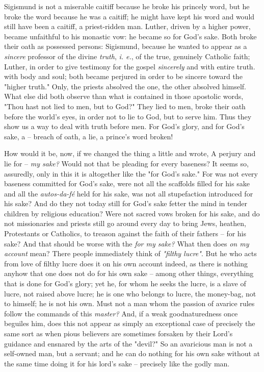 Sigismund is not a miserable caitiff because he broke his princely word, but 
he broke the word because he was a caitiff; he might have kept his word and 
would still have been a caitiff, a priest-ridden man. Luther, driven by a 
higher power, became unfaithful to his monastic vow: he became so for God's 
sake. Both broke their oath as possessed persons: Sigismund, because he wanted 
to appear as a \textit{sincere} professor of the divine \textit{truth}, 
\textit{i. e.}, of the true, genuinely Catholic faith; Luther, in order to 
give testimony for the gospel \textit{sincerely} and with entire truth. with 
body and soul; both became perjured in order to be sincere toward the 
"{}higher truth."{} Only, the priests absolved the one, the other absolved 
himself. What else did both observe than what is contained in those apostolic 
words, "{}Thou hast not lied to men, but to God?"{} They lied to men, broke 
their oath before the world's eyes, in order not to lie to God, but to serve 
him. Thus they show us a way to deal with truth before men. For God's glory, 
and for God's sake, a -- breach of oath, a lie, a prince's word broken!

How would it be, now, if we changed the thing a little and wrote, A perjury 
and lie for -- \textit{my sake?} Would not that be pleading for every 
baseness? It seems so, assuredly, only in this it is altogether like the 
"{}for God's sake."{} For was not every baseness committed for God's sake, 
were not all the scaffolds filled for his sake and all the 
\textit{autos-da-f\'e} held for his sake, was not all stupefaction introduced 
for his sake? And do they not today still for God's sake fetter the mind in 
tender children by religious education? Were not sacred vows broken for his 
sake, and do not missionaries and priests still go around every day to bring 
Jews, heathen, Protestants or Catholics, to treason against the faith of their 
fathers -- for his sake? And that should be worse with the \textit{for my 
sake?} What then does \textit{on my account} mean? There people immediately 
think of \textit{"{}filthy lucre"{}}. But he who acts from love of filthy 
lucre does it on his own account indeed, as there is nothing anyhow that one 
does not do for his own sake -- among other things, everything that is done 
for God's glory; yet he, for whom he seeks the lucre, is a slave of lucre, not 
raised above lucre; he is one who belongs to lucre, the money-bag, not to 
himself; he is not his own. Must not a man whom the passion of avarice rules 
follow the commands of this \textit{master?} And, if a weak goodnaturedness 
once beguiles him, does this not appear as simply an exceptional case of 
precisely the same sort as when pious believers are sometimes forsaken by 
their Lord's guidance and ensnared by the arts of the "{}devil?"{} So an 
avaricious man is not a self-owned man, but a servant; and he can do nothing 
for his own sake without at the same time doing it for his lord's sake -- 
precisely like the godly man.


